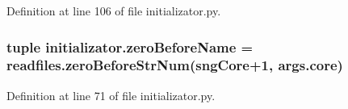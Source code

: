 Definition at line 106 of file initializator.\+py.

\hypertarget{a00137_a475e51ace78f2490aa4206915d0e3ae6}{
\subsubsection[{zero\+Before\+Name}]{\setlength{\rightskip}{0pt plus 5cm}tuple initializator.\+zero\+Before\+Name = readfiles.\+zero\+Before\+Str\+Num(sng\+Core+1, args.\+core)}}\label{a00137_a475e51ace78f2490aa4206915d0e3ae6}


Definition at line 71 of file initializator.\+py.

